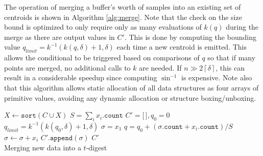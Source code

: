 \documentclass[11pt]{amsart}
\begin{document}
The operation of merging a buffer's worth of samples into an existing set of centroids is shown in Algorithm \ref{alg:merge}. Note that the check on the size bound is optimized to only require only as many evaluations of $k(q)$ during the merge as there are output values in $C'$. This is done by computing the bounding value $q_{limit} = k^{-1}(k(q, \delta) + 1, \delta)$ each time a new centroid is emitted. This allows the conditional to be triggered based on comparisons of $q$ so that if many points are merged, no additional calls to $k$ are needed. If $n \gg 2 \left \lceil \delta \right \rceil$, this can result in a considerable speedup since computing $\sin^{-1}$ is expensive. Note also that this algorithm allows static allocation of all data structures as four arrays of primitive values, avoiding any dynamic allocation or structure boxing/unboxing.
\begin{algorithm}[ht]
 \label{alg:merge}
\SetNoFillComment
{}
$X \gets \mathtt{sort}(C \cup X)$\;
$ S = \sum_i x_i.\mathtt{count}$\;
$C' = \lbrack \, \rbrack, q_0 = 0$\;
$q_{limit}=k^{-1}(k(q_0, \delta)+1, \delta)$\;
$\sigma = x_1$\;
 {
  $q = q_0 + (\sigma.\mathtt{count} + x_i.\mathtt{count})/S$\;
   {
      $\sigma \gets \sigma + x_i$\;
  } 
} 
$C'\mathtt{.append}(\sigma)$\;
\Return $ C' $\\
\caption{Merging new data into a $t$-digest}
\end{algorithm}
\end{document}
